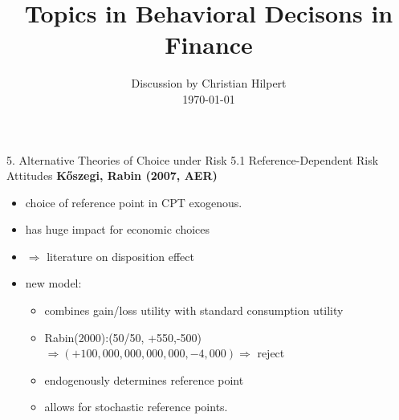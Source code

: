 \documentclass[11pt,aspectratio=169]{beamer}
\begin{document}

\title{Topics in Behavioral Decisons in Finance}
\date{Discussion by Christian Hilpert\\ \today}
\begin{frame}
    \titlepage
\end{frame}

\begin{frame}{5. Alternative Theories of Choice under Risk}
    {5.1 Reference-Dependent Risk Attitudes}
\textbf{Kőszegi, Rabin (2007, AER)}
    \begin{itemize}
 
        \item choice of reference point in CPT exogenous.\medskip
        \item has huge impact for economic choices\medskip
        \item $\Rightarrow$ literature on disposition effect\medskip
        \item new model:\medskip
        \begin{itemize}
            \item combines gain/loss utility with standard consumption utility \medskip
            \item Rabin(2000):(50/50, +550,-500) $\Rightarrow (+100,000,000,000,000, -4,000) \Rightarrow $ reject\medskip
            \item endogenously determines reference point\medskip
            \item allows for stochastic reference points.\medskip
        \end{itemize}

	\end{itemize}
\end{frame}
\end{document}
